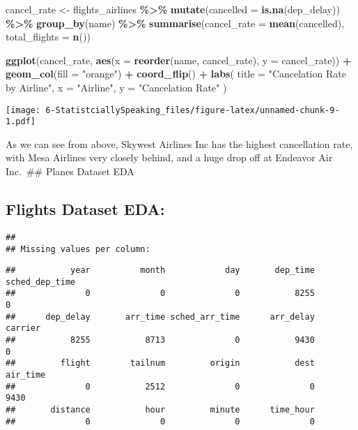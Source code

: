 \documentclass[
]{article}
\newenvironment{Shaded}{\begin{snugshade}}{\end{snugshade}}
\newcommand{\AttributeTok}[1]{\textcolor[rgb]{0.13,0.29,0.53}{#1}}
\newcommand{\FunctionTok}[1]{\textcolor[rgb]{0.13,0.29,0.53}{\textbf{#1}}}
\newcommand{\NormalTok}[1]{#1}
\newcommand{\OtherTok}[1]{\textcolor[rgb]{0.56,0.35,0.01}{#1}}
\newcommand{\SpecialCharTok}[1]{\textcolor[rgb]{0.81,0.36,0.00}{\textbf{#1}}}
\newcommand{\StringTok}[1]{\textcolor[rgb]{0.31,0.60,0.02}{#1}}
\begin{document}
\begin{Shaded}
\begin{Highlighting}[]
\NormalTok{cancel\_rate }\OtherTok{\textless{}{-}}\NormalTok{ flights\_airlines }\SpecialCharTok{\%\textgreater{}\%}
  \FunctionTok{mutate}\NormalTok{(}\AttributeTok{cancelled =} \FunctionTok{is.na}\NormalTok{(dep\_delay)) }\SpecialCharTok{\%\textgreater{}\%}
  \FunctionTok{group\_by}\NormalTok{(name) }\SpecialCharTok{\%\textgreater{}\%}
  \FunctionTok{summarise}\NormalTok{(}\AttributeTok{cancel\_rate =} \FunctionTok{mean}\NormalTok{(cancelled), }\AttributeTok{total\_flights =} \FunctionTok{n}\NormalTok{())}

\FunctionTok{ggplot}\NormalTok{(cancel\_rate, }\FunctionTok{aes}\NormalTok{(}\AttributeTok{x =} \FunctionTok{reorder}\NormalTok{(name, cancel\_rate), }\AttributeTok{y =}\NormalTok{ cancel\_rate)) }\SpecialCharTok{+}
  \FunctionTok{geom\_col}\NormalTok{(}\AttributeTok{fill =} \StringTok{"orange"}\NormalTok{) }\SpecialCharTok{+}
  \FunctionTok{coord\_flip}\NormalTok{() }\SpecialCharTok{+}
  \FunctionTok{labs}\NormalTok{(}
    \AttributeTok{title =} \StringTok{"Cancelation Rate by Airline"}\NormalTok{,}
    \AttributeTok{x =} \StringTok{"Airline"}\NormalTok{,}
    \AttributeTok{y =} \StringTok{"Cancelation Rate"}
\NormalTok{  )}
\end{Highlighting}
\end{Shaded}

\texttt{[image: 6-StatistciallySpeaking\_files/figure-latex/unnamed-chunk-9-1.pdf]}

As we can see from above, Skywest Airlines Inc has the highest
cancellation rate, with Mesa Airlines very closely behind, and a huge
drop off at Endeavor Air Inc.~\#\# Planes Dataset EDA

\subsection{Flights Dataset EDA:}\label{flights-dataset-eda}

\begin{verbatim}
## 
## Missing values per column:
\end{verbatim}

\begin{verbatim}
##           year          month            day       dep_time sched_dep_time 
##              0              0              0           8255              0 
##      dep_delay       arr_time sched_arr_time      arr_delay        carrier 
##           8255           8713              0           9430              0 
##         flight        tailnum         origin           dest       air_time 
##              0           2512              0              0           9430 
##       distance           hour         minute      time_hour 
##              0              0              0              0
\end{verbatim}
\end{document}
